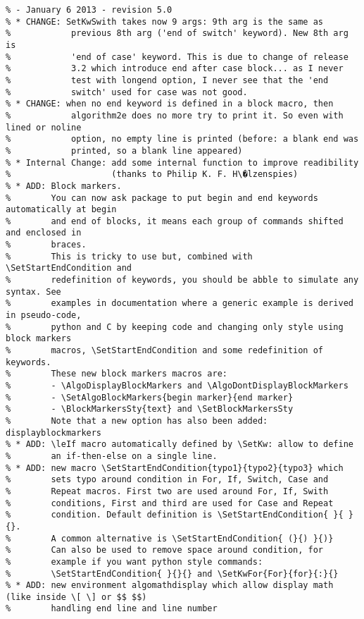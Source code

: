 \documentclass[a4paper]{article}
\begin{document}
\begin{verbatim}
% - January 6 2013 - revision 5.0
% * CHANGE: SetKwSwith takes now 9 args: 9th arg is the same as
%            previous 8th arg ('end of switch' keyword). New 8th arg is
%            'end of case' keyword. This is due to change of release
%            3.2 which introduce end after case block... as I never
%            test with longend option, I never see that the 'end
%            switch' used for case was not good.
% * CHANGE: when no end keyword is defined in a block macro, then
%            algorithm2e does no more try to print it. So even with lined or noline
%            option, no empty line is printed (before: a blank end was
%            printed, so a blank line appeared)
% * Internal Change: add some internal function to improve readibility
%                    (thanks to Philip K. F. H\�lzenspies)
% * ADD: Block markers. 
%        You can now ask package to put begin and end keywords automatically at begin
%        and end of blocks, it means each group of commands shifted and enclosed in
%        braces.
%        This is tricky to use but, combined with \SetStartEndCondition and
%        redefinition of keywords, you should be abble to simulate any syntax. See
%        examples in documentation where a generic example is derived in pseudo-code,
%        python and C by keeping code and changing only style using block markers
%        macros, \SetStartEndCondition and some redefinition of keywords.
%        These new block markers macros are:
%        - \AlgoDisplayBlockMarkers and \AlgoDontDisplayBlockMarkers
%        - \SetAlgoBlockMarkers{begin marker}{end marker}
%        - \BlockMarkersSty{text} and \SetBlockMarkersSty
%        Note that a new option has also been added: displayblockmarkers
% * ADD: \leIf macro automatically defined by \SetKw: allow to define
%        an if-then-else on a single line.
% * ADD: new macro \SetStartEndCondition{typo1}{typo2}{typo3} which
%        sets typo around condition in For, If, Switch, Case and
%        Repeat macros. First two are used around For, If, Swith
%        conditions, First and third are used for Case and Repeat
%        condition. Default definition is \SetStartEndCondition{ }{ }{}.
%        A common alternative is \SetStartEndCondition{ (}{) }{)}
%        Can also be used to remove space around condition, for
%        example if you want python style commands:
%        \SetStartEndCondition{ }{}{} and \SetKwFor{For}{for}{:}{}
% * ADD: new environment algomathdisplay which allow display math (like inside \[ \] or $$ $$) 
%        handling end line and line number

\end{verbatim}
\end{document}
